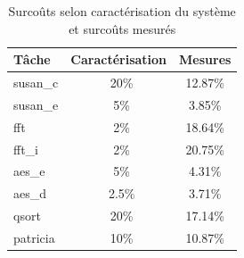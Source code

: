 \begin{table}[H]
\centering
\begin{tabular}{l|c|c}
Tâche & Caractérisation & Mesures\\
\hline
susan\_c & ~20\% & 12.87\%\\
susan\_e & ~5\%  & 3.85\%\\
fft      & ~2\%  & 18.64\%\\
fft\_i   & ~2\%  & 20.75\%\\
aes\_e   & ~5\%  & 4.31\% \\
aes\_d   & ~2.5\%& 3.71\%\\
qsort    & ~20\% & 17.14\%\\
patricia & ~10\% & 10.87\%\\
\end{tabular}
\caption{Surcoûts selon caractérisation du système et surcoûts mesurés}
\label{carac}
\end{table}

